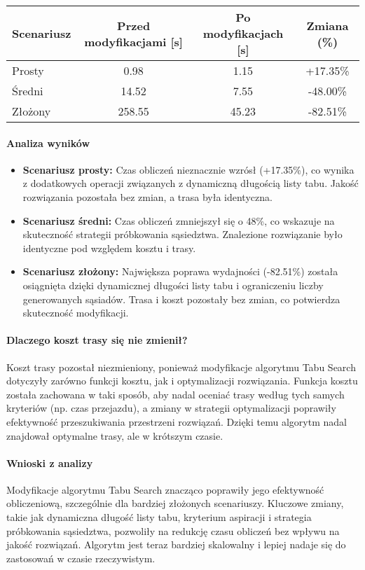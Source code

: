 \documentclass[12pt,a4paper]{article}
\begin{document}
\begin{center}
\begin{tabular}{|l|c|c|c|}
\hline
\textbf{Scenariusz} & \textbf{Przed modyfikacjami [s]} & \textbf{Po modyfikacjach [s]} & \textbf{Zmiana (\%)} \\
\hline
Prosty & 0.98 & 1.15 & +17.35\% \\
Średni & 14.52 & 7.55 & -48.00\% \\
Złożony & 258.55 & 45.23 & -82.51\% \\
\hline
\end{tabular}
\end{center}

\paragraph{Analiza wyników}
\begin{itemize}
    \item \textbf{Scenariusz prosty:} Czas obliczeń nieznacznie wzrósł (+17.35\%), co wynika z dodatkowych operacji związanych z dynamiczną długością listy tabu. Jakość rozwiązania pozostała bez zmian, a trasa była identyczna.
    \item \textbf{Scenariusz średni:} Czas obliczeń zmniejszył się o 48\%, co wskazuje na skuteczność strategii próbkowania sąsiedztwa. Znalezione rozwiązanie było identyczne pod względem kosztu i trasy.
    \item \textbf{Scenariusz złożony:} Największa poprawa wydajności (-82.51\%) została osiągnięta dzięki dynamicznej długości listy tabu i ograniczeniu liczby generowanych sąsiadów. Trasa i koszt pozostały bez zmian, co potwierdza skuteczność modyfikacji.
\end{itemize}

\paragraph{Dlaczego koszt trasy się nie zmienił?}
Koszt trasy pozostał niezmieniony, ponieważ modyfikacje algorytmu Tabu Search dotyczyły zarówno funkcji kosztu, jak i optymalizacji rozwiązania. Funkcja kosztu została zachowana w taki sposób, aby nadal oceniać trasy według tych samych kryteriów (np. czas przejazdu), a zmiany w strategii optymalizacji poprawiły efektywność przeszukiwania przestrzeni rozwiązań. Dzięki temu algorytm nadal znajdował optymalne trasy, ale w krótszym czasie.

\paragraph{Wnioski z analizy}
Modyfikacje algorytmu Tabu Search znacząco poprawiły jego efektywność obliczeniową, szczególnie dla bardziej złożonych scenariuszy. Kluczowe zmiany, takie jak dynamiczna długość listy tabu, kryterium aspiracji i strategia próbkowania sąsiedztwa, pozwoliły na redukcję czasu obliczeń bez wpływu na jakość rozwiązań. Algorytm jest teraz bardziej skalowalny i lepiej nadaje się do zastosowań w czasie rzeczywistym.
\end{document}
